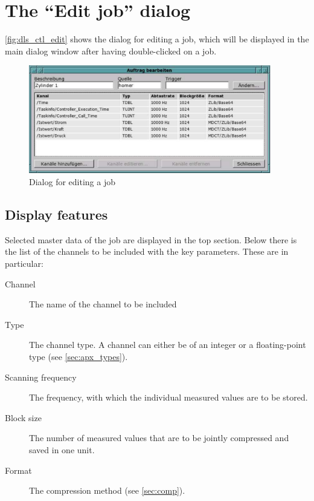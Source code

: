\documentclass[a4paper,12pt,BCOR6mm,bibtotoc,idxtotoc]{scrbook}
\begin{document}

\section{The ``Edit job'' dialog}
\label{sec:manager_auftrag_edit}

\autoref{fig:dls_ctl_edit} shows the dialog for editing a job, which will be
displayed in the main dialog window after having double-clicked on a job.

\begin{figure}[tbh] \begin{center} \includegraphics[width=300pt]{bilder/ctl_edit} \end{center} \caption{Dialog for editing a job} \label{fig:dls_ctl_edit} \end{figure}


\subsection{Display features}

Selected master data of the job are displayed in the top section. Below there is the list of the channels to be included with the key parameters. These are in particular:

\begin{description}

\item[Channel] The name of the channel to be included

\item[Type] The channel type. A channel can either be of an integer or a
floating-point type (see \autoref{sec:apx_types}).

\item[Scanning frequency] The frequency, with which the individual measured
values are to be stored.

\item[Block size] The number of measured values that are to be jointly
compressed and saved in one unit.

\item[Format] The compression method (see \autoref{sec:comp}).

\end{description}
\end{document}
